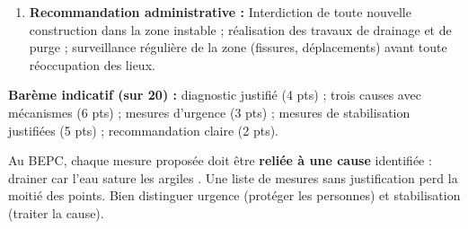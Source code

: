 \documentclass[11pt]{article}
\begin{document}
\begin{corrige}
\begin{enumerate}
\begin{enumerate}
      \item \textbf{Purge / allègement de la tête} : enlever les terres instables et les surcharges en haut de pente $\Rightarrow$ diminution de la force qui pousse le terrain.
      \item \textbf{Soutènement ou reboisement} : construire un mur de soutènement au pied (butée) et/ou replanter des arbres dont les racines renforceront le sol et pomperont l'eau.
      \end{enumerate}
\item \textbf{Recommandation administrative :} \og Interdiction de toute nouvelle construction dans la zone instable ; réalisation des travaux de drainage et de purge ; surveillance régulière de la zone (fissures, déplacements) avant toute réoccupation des lieux. \fg
\end{enumerate}
\textbf{Barème indicatif (sur 20) :} diagnostic justifié (4 pts) ; trois causes avec mécanismes (6 pts) ; mesures d'urgence (3 pts) ; mesures de stabilisation justifiées (5 pts) ; recommandation claire (2 pts).
\end{corrige}
\begin{attention}
Au BEPC, chaque mesure proposée doit être \textbf{reliée à une cause} identifiée : \og drainer car l'eau sature les argiles \fg. Une liste de mesures sans justification perd la moitié des points. Bien distinguer urgence (protéger les personnes) et stabilisation (traiter la cause).
\end{attention}
\end{document}
